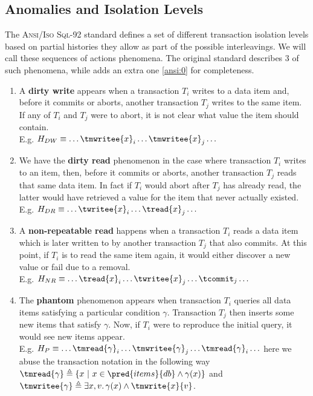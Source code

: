 \subsection{Anomalies and Isolation Levels}

The \textsc{Ansi/Iso Sql-92} standard \cite{ansi92} defines a set of different transaction isolation levels based on partial histories they allow as part of the possible interleavings. We will call these sequences of actions phenomena. The original standard describes 3 of such phenomena, while \cite{isolationansi} adds an extra one \ref{ansi:0} for completeness.

\begin{enumerate}[label=(\textbf{P\arabic*})]\addtocounter{enumi}{-1}
\item \label{ansi:0} A \textbf{dirty write} appears when a transaction $T_i$ writes to a data item and, before it commits or aborts, another transaction $T_j$ writes to the same item. If any of $T_i$ and $T_j$ were to abort, it is not clear what value the item should contain.
\\
E.g. $H_{DW} \equiv \ldots \tmwritee{x}_i \ldots \tmwritee{x}_j \ldots$
\item We have the \textbf{dirty read} phenomenon in the case where transaction $T_i$ writes to an item, then, before it commits or aborts, another transaction $T_j$ reads that same data item. In fact if $T_i$ would abort after $T_j$ has already read, the latter would have retrieved a value for the item that never actually existed.
\\
E.g. $H_{DR} \equiv \ldots \twritee{x}_i \ldots \tread{x}_j \ldots$
\item A \textbf{non-repeatable read} happens when a transaction $T_i$ reads a data item which is later written to by another transaction $T_j$ that also commits. At this point, if $T_i$ is to read the same item again, it would either discover a new value or fail due to a removal.
\\
E.g. $H_{NR} \equiv \ldots \tread{x}_i \ldots \twritee{x}_j \ldots \tcommit_j \ldots$
\item The \textbf{phantom} phenomenon appears when transaction $T_i$ queries all data items satisfying a particular condition $\gamma$. Transaction $T_j$ then inserts some new items that satisfy $\gamma$. Now, if $T_i$ were to reproduce the initial query, it would see new items appear.
\\
E.g. $H_{P} \equiv \ldots \tmread{\gamma}_i \ldots \tmwritee{\gamma}_j \ldots \tmread{\gamma}_i \ldots$ here we abuse the transaction notation in the following way $\tmread{\gamma} \triangleq \left\lbrace x\ |\ x \in \pred{items}{db} \land \gamma(x) \right\rbrace$ and $\tmwritee{\gamma} \triangleq \exists x, v \ldotp \gamma(x) \land \tmwrite{x}{v}$.
\end{enumerate}

